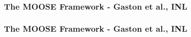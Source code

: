 \frame
{
  \frametitle{The MOOSE Framework - Gaston et al., INL}
  \begin{center}
  \end{center}
}



\frame
{
  \frametitle{The MOOSE Framework - Gaston et al., INL}
  \begin{center}
  \end{center}
}
